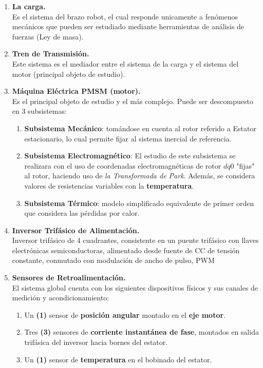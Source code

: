 \documentclass[blue,fullpaper]{ludusofficial}  %
\begin{document}
\begin{enumerate}
    \item \textbf{La carga.}\\Es el sistema del brazo robot, el cual responde unicamente a fenómenos mecánicos que pueden ser estudiado mediante herramientas de análisis de fuerzas (Ley de masa).
    \item \textbf{Tren de Transmisión.}\\Este sistema es el mediador entre el sistema de la carga y el sistema del motor (principal objeto de estudio). 
    \item \textbf{Máquina Eléctrica PMSM (motor).}\\Es el principal objeto de estudio y el más complejo. Puede ser descompuesto en 3 subsistemas:
    \begin{enumerate}
        \item \textbf{Subsistema Mecánico}: tomándose en cuenta al rotor referido a Estator estacionario, lo cual permite fijar al sistema inercial de referencia.
        \item \textbf{Subsistema Electromagnético}: El estudio de este subsistema se realizara con el uso de coordenadas electromagnéticas de rotor $dq0$ "fijas" al rotor, haciendo uso de \textit{la Transformada de Park}. Además, se considera valores de resistencias variables con la \textbf{temperatura}.
        \item \textbf{Subsistema Térmico}: modelo simplificado equivalente de primer orden que considera las pérdidas por calor.
    \end{enumerate}
    \item \textbf{Inversor Trifásico de Alimentación.}\\Inversor trifásico de 4 cuadrantes, consistente en un puente trifásico con llaves electrónicas semiconductoras, alimentado desde fuente de CC de tensión constante, conmutado con modulación de ancho de pulso, PWM 
    \item \textbf{Sensores de Retroalimentación.}\\El sistema global cuenta con los siguientes dispositivos físicos y sus canales de medición y acondicionamiento:
    \begin{enumerate}
        \item Un \textbf{(1)} sensor de \textbf{posición angular} montado en el \textbf{eje motor}.
        \item Tres \textbf{(3)} sensores de \textbf{corriente instantánea de fase}, montados en salida trifásica del inversor hacia bornes del estator.
        \item Un \textbf{(1)} sensor de \textbf{temperatura} en el bobinado del estator.
    \end{enumerate}
\end{enumerate}
\end{document}
